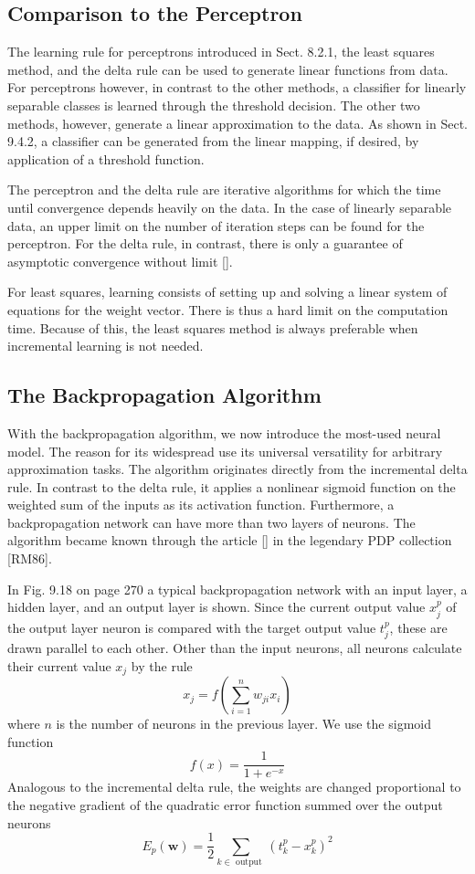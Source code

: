\documentclass[10pt]{book}
\begin{document}
\subsection{Comparison to the Perceptron}
The learning rule for perceptrons introduced in Sect. 8.2.1, the least squares method, and the delta rule can be used to generate linear functions from data. For perceptrons however, in contrast to the other methods, a classifier for linearly separable classes is learned through the threshold decision. The other two methods, however, generate a linear approximation to the data. As shown in Sect. 9.4.2, a classifier can be generated from the linear mapping, if desired, by application of a threshold function.

The perceptron and the delta rule are iterative algorithms for which the time until convergence depends heavily on the data. In the case of linearly separable data, an upper limit on the number of iteration steps can be found for the perceptron. For the delta rule, in contrast, there is only a guarantee of asymptotic convergence without limit [\cite{hertz1991neural}].

For least squares, learning consists of setting up and solving a linear system of equations for the weight vector. There is thus a hard limit on the computation time. Because of this, the least squares method is always preferable when incremental learning is not needed.

\subsection{The Backpropagation Algorithm}
With the backpropagation algorithm, we now introduce the most-used neural model. The reason for its widespread use its universal versatility for arbitrary approximation tasks. The algorithm originates directly from the incremental delta rule. In contrast to the delta rule, it applies a nonlinear sigmoid function on the weighted sum of the inputs as its activation function. Furthermore, a backpropagation network can have more than two layers of neurons. The algorithm became known through the article [\cite{rumelhart1986backprop}] in the legendary PDP collection [RM86].

In Fig. 9.18 on page 270 a typical backpropagation network with an input layer, a hidden layer, and an output layer is shown. Since the current output value $x_{j}^{p}$ of the output layer neuron is compared with the target output value $t_{j}^{p}$, these are drawn parallel to each other. Other than the input neurons, all neurons calculate their current value $x_{j}$ by the rule
\begin{equation*}
x_{j}=f\left(\sum_{i=1}^{n} w_{j i} x_{i}\right) \tag{9.14}
\end{equation*}
where $n$ is the number of neurons in the previous layer. We use the sigmoid function
$$
f(x)=\frac{1}{1+e^{-x}}
$$
Analogous to the incremental delta rule, the weights are changed proportional to the negative gradient of the quadratic error function summed over the output neurons
$$
E_{p}(\boldsymbol{w})=\frac{1}{2} \sum_{k \in \text { output }}\left(t_{k}^{p}-x_{k}^{p}\right)^{2}
$$
\end{document}

